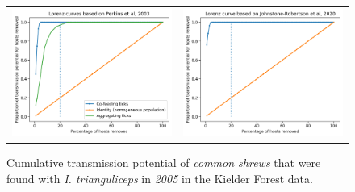 \documentclass{article}
\begin{document}
\begin{figure}[h!]
	\centering
	\begin{tabular}{ll}
		\includegraphics[width=.48\linewidth,valign=m]{lorenz_perkins_SA_2005_I.Trianguliceps} & \includegraphics[width=.48\linewidth,valign=m]{lorenz_JR_SA_2005_I.Trianguliceps} \\
	\end{tabular}
	\caption{Cumulative transmission potential of \textit{common shrews} that were found with \textit{I. trianguliceps} in \textit{2005} in the Kielder Forest data.}
	\label{fig:lorenz_2005_itrianguliceps_SA}
\end{figure}
\end{document}
